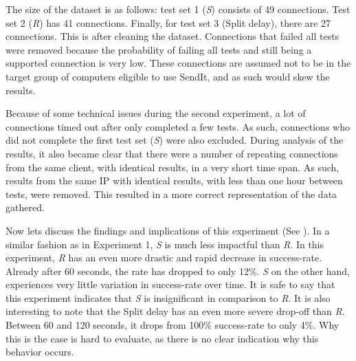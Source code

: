 The size of the dataset is as follows: test set 1 (\textit{S}) consists of 49 connections. Test set 2 (\textit{R}) has 41 connections. Finally, for test set 3 (Split delay), there are 27 connections. This is after cleaning the dataset. Connections that failed all tests were removed because the probability of failing all tests and still being a supported connection is very low. These connections are assumed not to be in the target group of computers eligible to use SendIt, and as such would skew the results.

Because of some technical issues during the second experiment, a lot of connections timed out after only completed a few tests. As such, connections who did not complete the first test set (\textit{S}) were also excluded. During analysis of the results, it also became clear that there were a number of repeating connections from the same client, with identical results, in a very short time span. As such, results from the same IP with identical results, with less than one hour between tests, were removed. This resulted in a more correct representation of the data gathered.

Now lets discuss the findings and implications of this experiment (See ). In a similar fashion as in Experiment 1, \textit{S} is much less impactful than \textit{R}. In this experiment, \textit{R} has an even more drastic and rapid decrease in success-rate. Already after 60 seconds, the rate has dropped to only 12\%. \textit{S} on the other hand, experiences very little variation in success-rate over time. It is safe to say that this experiment indicates that \textit{S} is insignificant in comparison to \textit{R}. It is also interesting to note that the Split delay has an even more severe drop-off than \textit{R}. Between 60 and 120 seconds, it drops from 100\% success-rate to only 4\%. Why this is the case is hard to evaluate, as there is no clear indication why this behavior occurs. 
%
%

